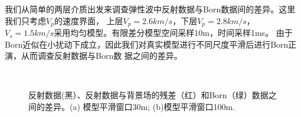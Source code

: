 我们从简单的两层介质出发来调查弹性波中反射数据与Born数据间的差异。这里我们只考虑$V_p$的速度界面，
上层$V_p=2.6km/s$，下层$V_p=2.8km/s$， $V_s=1.5km/s$采用均匀模型。有限差分模型空间采样10m，时间采样1ms。
由于Born近似在小扰动下成立，因此我们对真实模型进行不同尺度平滑后进行Born正演，从而调查反射数据与Born数
据之间的差异。
\begin{figure}[!htb]
   \centering
   \\
   \caption{反射数据(黑）、反射数据与背景场的残差（红）和Born（绿）数据之间的差异。(a)
   模型平滑窗口30m; (b)模型平滑窗口100m.}
   \label{fig:refl_born_comparison}
\end{figure}
